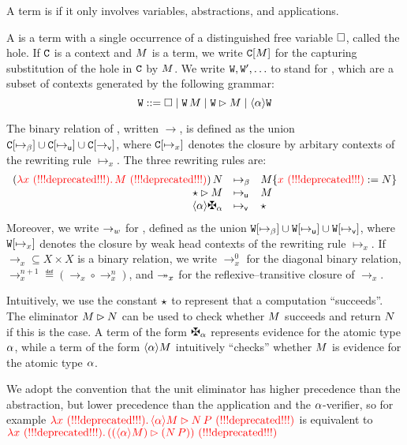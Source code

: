 A term is  if it only involves variables, abstractions, and applications.

A  is a term with a single occurrence of a distinguished free
variable $\Box$, called the hole.
If $\mathtt{C}$ is a context and $M$ is a term, we write $\mathtt{C}[M]$
for the capturing substitution of the hole in $\mathtt{C}$ by $M$.
We write $\mathtt{W},\mathtt{W}',\hdots$ to stand for , which are
a subset of contexts generated by the following grammar:
\[
  \mathtt{W} ::= \Box
       \mid \mathtt{W}\,M
       \mid \mathtt{W}\rhd M
       \mid \langle\alpha\rangle\mathtt{W}
\]

The binary relation of , written $\to$, is defined as the union
$\mathtt{C}[\mapsto_{\beta}] \cup \mathtt{C}[\mapsto_{\mathsf{u}}] \cup \mathtt{C}[\to_{\mathsf{v}}]$,
where $\mathtt{C}[\mapsto_x]$ denotes the closure by arbitary contexts of
the rewriting rule $\mapsto_x$.
The three rewriting rules are:
\[
  \begin{array}{rll}
    (\lam{\var}{\utm})\,\utmtwo
    & \axBeta &
    \utm\sub{\var}{\utmtwo}
  \\
    \eunit{\iunit}{\utm}
    & \axEIUnit &
    \utm
  \\
    \verifbtyp{\genbtyp}
    & \axVerifGen &
    \iunit
  \end{array}
\]
Moreover, we write $\to_{w}$ for , defined as the union
$\mathtt{W}[\mapsto_{\beta}] \cup \mathtt{W}[\mapsto_{\mathsf{u}}] \cup \mathtt{W}[\mapsto_{\mathsf{v}}]$,
where $\mathtt{W}[\mapsto_x]$ denotes the closure by weak head contexts of
the rewriting rule $\mapsto_x$.
If ${\to_x} \subseteq X \times X$ is a binary relation,
we write $\to^0_x$ for the diagonal binary relation,
$\to^{n+1}_x \eqdef (\to_x \circ \to^n_x)$,
and $\twoheadrightarrow_x$ for the reflexive--transitive closure of $\to_x$.

Intuitively, we use the constant $\star$ to represent that a computation ``succeeds''.
The eliminator $M\rhd N$ can be used to check whether $M$
succeeds and return $N$ if this is the case.
A term of the form $\genbtyp$
represents evidence for the atomic type $\alpha$,
while a term of the form $\langle\alpha\rangle M$ intuitively ``checks''
whether $M$ is evidence for the atomic type $\alpha$.

We adopt the convention that the unit eliminator has higher precedence than
the abstraction, but lower precedence than the application and
the $\alpha$-verifier, so for example
$\textcolor{red}{\lambda \textcolor{red}{x \text{\,\,(!!!deprecated!!!)}}.\,\langle\alpha\rangle M\rhd N\,P \text{\,\,(!!!deprecated!!!)}}$
is equivalent to
$\textcolor{red}{\lambda \textcolor{red}{x \text{\,\,(!!!deprecated!!!)}}.\,((\langle\alpha\rangle M)\rhd(N\,P)) \text{\,\,(!!!deprecated!!!)}}$

